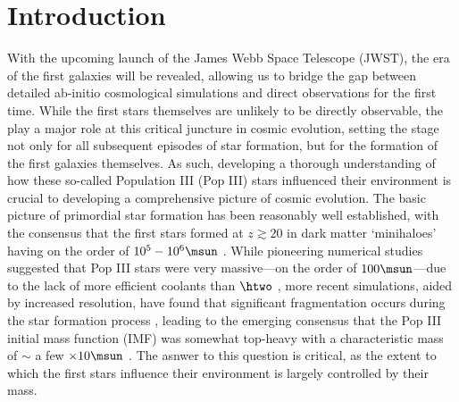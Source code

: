 \section{Introduction}
\label{intro}

With the upcoming launch of the James Webb Space Telescope (JWST), the era of the first galaxies will be revealed, allowing us to bridge the gap between detailed ab-initio cosmological simulations and direct observations for the first time. While the first stars themselves are unlikely to be directly observable, the play a major role at this critical juncture in cosmic evolution, setting the stage not only for all subsequent episodes of star formation, but for the formation of the first galaxies themselves.  As such, developing a thorough understanding of how these so-called Population III (Pop III) stars influenced their environment is crucial to developing a comprehensive picture of cosmic evolution. The basic picture of primordial star formation has been reasonably well established, with the consensus that the first stars formed at $z\gtrsim20$ in dark matter `minihaloes' having on the order of $10^5 - 10^6\msun$ \citep{CouchmanRees1986, HaimanThoulLoeb1996, Tegmarketal1997}. While pioneering numerical studies suggested that Pop III stars were very massive---on the order of $100\msun$---due to the lack of more efficient coolants than $\htwo$ \citep[e.g.,][]{BrommCoppiLarson1999, BrommCoppiLarson2002, AbelBryanNorman2002, Yoshidaetal2003, BrommLarson2004, Yoshidaetal2006, O'SheaNorman2007}, more recent simulations, aided by increased resolution, have found that significant fragmentation occurs during the star formation process \citep{StacyGreifBromm2010, Clarketal2011a, Clarketal2011b, Greifetal2011, Greifetal2012, StacyBromm2013, Hiranoetal2014}, leading to the emerging consensus that the Pop III initial mass function (IMF) was somewhat top-heavy with a characteristic mass of $\sim$ a few $\times 10\msun$ \citep{Bromm2013}.  The asnwer to this question is critical, as the extent to which the first stars influence their environment is largely controlled by their mass.

